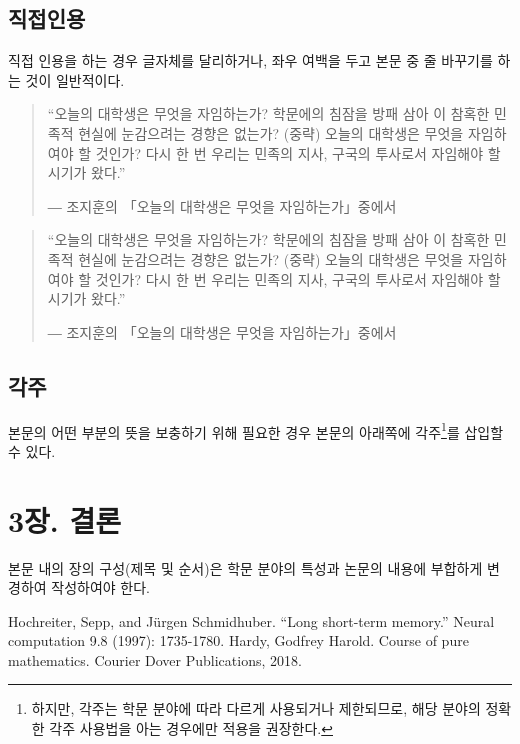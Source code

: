 \documentclass[11pt]{report}
\begin{document}
\section{직접인용}\label{sec:quotation}
직접 인용을 하는 경우 글자체를 달리하거나, 좌우 여백을 두고 본문 중 줄 바꾸기를 하는 것이 일반적이다.\par
\bigskip

\begin{quote}
“오늘의 대학생은 무엇을 자임하는가? 학문에의 침잠을 방패 삼아 이 참혹한 민족적 현실에 눈감으려는 경향은 없는가? (중략) 오늘의 대학생은 무엇을 자임하여야 할 것인가? 다시 한 번 우리는 민족의 지사, 구국의 투사로서 자임해야 할 시기가 왔다.” \par
― 조지훈의  「오늘의 대학생은 무엇을 자임하는가」중에서 
\end{quote}
\bigskip

\begin{quotation}
“오늘의 대학생은 무엇을 자임하는가? 학문에의 침잠을 방패 삼아 이 참혹한 민족적 현실에 눈감으려는 경향은 없는가? (중략) 오늘의 대학생은 무엇을 자임하여야 할 것인가? 다시 한 번 우리는 민족의 지사, 구국의 투사로서 자임해야 할 시기가 왔다.” \par
― 조지훈의  「오늘의 대학생은 무엇을 자임하는가」중에서 
\end{quotation}

\newpage

\section{각주}\label{sec:footnotes}

본문의 어떤 부분의 뜻을 보충하기 위해 필요한 경우 본문의 아래쪽에 각주\footnote{하지만, 각주는 학문 분야에 따라 다르게 사용되거나 제한되므로, 해당 분야의 정확한 각주 사용법을 아는 경우에만 적용을 권장한다.}를 삽입할 수 있다.



\chapter*{3장. 결론}
\setcounter{chapter}{3}
\setcounter{section}{0}
\setcounter{subsection}{0}
본문 내의 장의 구성(제목 및 순서)은 학문 분야의 특성과 논문의 내용에 부합하게 변경하여 작성하여야 한다.\par


\normalsize
\newpage
\renewcommand\bibname{참고문헌}
\begin{thebibliography}{AA}
 Hochreiter, Sepp, and Jürgen Schmidhuber. ``Long short-term memory.'' Neural computation 9.8 (1997): 1735-1780.
 Hardy, Godfrey Harold. Course of pure mathematics. Courier Dover Publications, 2018.
\end{thebibliography}
\end{document}
